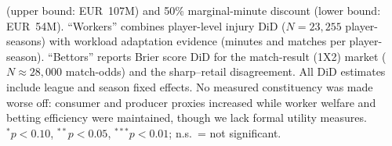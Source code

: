 \begin{table}[htbp]
\begin{threeparttable}
\begin{tablenotes}[flushleft]
(upper bound: EUR~107M) and 50\% marginal-minute discount (lower bound: EUR~54M).
``Workers'' combines player-level injury DiD ($N = 23{,}255$ player-seasons) with
workload adaptation evidence (minutes and matches per player-season). ``Bettors'' reports
Brier score DiD for the match-result (1X2) market ($N \approx 28{,}000$
match-odds) and the sharp--retail disagreement. All DiD estimates include league and season fixed effects. No measured constituency was made worse off: consumer and producer proxies increased while
worker welfare and betting efficiency were maintained, though we lack formal utility measures. $^{*}p<0.10$, $^{**}p<0.05$,
$^{***}p<0.01$; n.s.\ = not significant.
\end{tablenotes}
\end{threeparttable}
\end{table}
